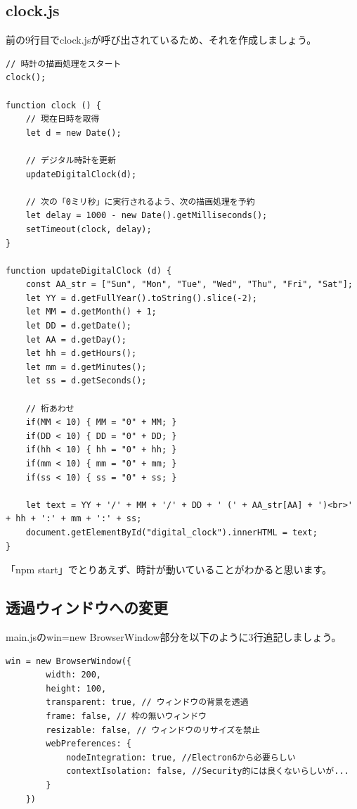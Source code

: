 \documentclass[mingoth,11pt,a4j,uplatex]{jsarticle}
\begin{document}
\subsection{clock.js}
前の9行目でclock.jsが呼び出されているため、それを作成しましょう。
\begin{lstlisting}[caption=DigitalClock：clock.js]
// 時計の描画処理をスタート
clock();

function clock () {
    // 現在日時を取得
    let d = new Date();

    // デジタル時計を更新
    updateDigitalClock(d);

    // 次の「0ミリ秒」に実行されるよう、次の描画処理を予約
    let delay = 1000 - new Date().getMilliseconds();
    setTimeout(clock, delay);
}

function updateDigitalClock (d) {
    const AA_str = ["Sun", "Mon", "Tue", "Wed", "Thu", "Fri", "Sat"];
    let YY = d.getFullYear().toString().slice(-2);
    let MM = d.getMonth() + 1;
    let DD = d.getDate();
    let AA = d.getDay();
    let hh = d.getHours();
    let mm = d.getMinutes();
    let ss = d.getSeconds();

    // 桁あわせ
    if(MM < 10) { MM = "0" + MM; }
    if(DD < 10) { DD = "0" + DD; }
    if(hh < 10) { hh = "0" + hh; }
    if(mm < 10) { mm = "0" + mm; }
    if(ss < 10) { ss = "0" + ss; }

    let text = YY + '/' + MM + '/' + DD + ' (' + AA_str[AA] + ')<br>' + hh + ':' + mm + ':' + ss;
    document.getElementById("digital_clock").innerHTML = text;
}
\end{lstlisting}

「npm start」でとりあえず、時計が動いていることがわかると思います。

\subsection{透過ウィンドウへの変更}
main.jsのwin=new BrowserWindow部分を以下のように3行追記しましょう。

\begin{lstlisting}[caption=DigitalClock：main.js ]
    win = new BrowserWindow({
        width: 200,
        height: 100,
        transparent: true, // ウィンドウの背景を透過
        frame: false, // 枠の無いウィンドウ
        resizable: false, // ウィンドウのリサイズを禁止
        webPreferences: {
            nodeIntegration: true, //Electron6から必要らしい
            contextIsolation: false, //Security的には良くないらしいが...
        }
    })
\end{lstlisting}
\end{document}
